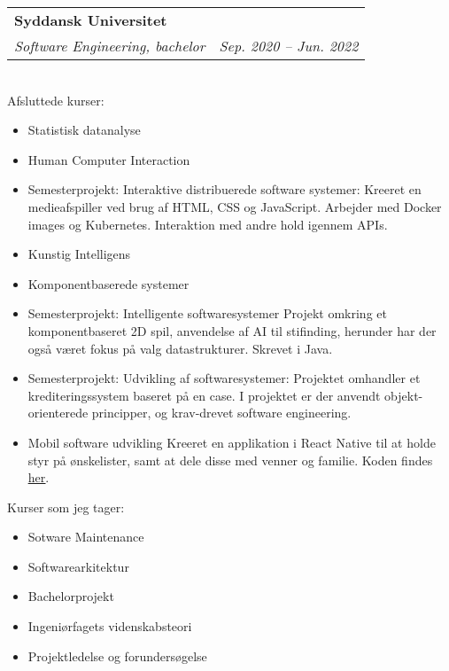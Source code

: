 \documentclass[11pt]{article}
\makeatletter
\newcommand{\resumeSubheading}[4]{
  \noindent\begin{tabular*}{0.98\textwidth}[t]{l@{\extracolsep{\fill}}r}
    \noindent \textbf{#1} & #2 \\ \vspace{-3pt} 
    \noindent \textit{\small#3} & \textit{\small #4} 
  \end{tabular*}\vspace{7pt}
}
\makeatother
\begin{document}
\resumeSubheading{Syddansk Universitet}{}{Software Engineering, bachelor}{Sep.
2020 -- Jun. 2022}\\\vspace{0.25cm}
{\indent\small Afsluttede kurser: }
  \vspace{-0.3cm}
  {\small 
  \begin{itemize}
  \setlength{\itemsep}{-1pt}
    \item Statistisk datanalyse
    \item Human Computer Interaction
    \item Semesterprojekt: Interaktive distribuerede software systemer:
      \subitem Kreeret en medieafspiller ved brug af HTML, CSS og JavaScript.
      Arbejder med Docker images og Kubernetes. Interaktion med andre hold
      igennem APIs.
    \item Kunstig Intelligens
    \item Komponentbaserede systemer
    \item Semesterprojekt: Intelligente softwaresystemer
      \subitem Projekt omkring et komponentbaseret 2D spil, anvendelse af AI til
      stifinding, herunder har der også været fokus på valg datastrukturer.
      Skrevet i Java.
    \item Semesterprojekt: Udvikling af softwaresystemer:
      \subitem Projektet omhandler et krediteringssystem baseret på en case. I
      projektet er der anvendt objekt-orienterede principper, og krav-drevet
      software engineering.
    \item Mobil software udvikling
      \subitem Kreeret en applikation i React Native til at holde styr på
      ønskelister, samt at dele disse med venner og familie. Koden findes
      \href{https://github.com/simonplatz/wishwell}{\underline{her}}.
\end{itemize}} 
{\indent\small Kurser som jeg tager:}
  {\small 
  \begin{itemize}
  \setlength{\itemsep}{-1pt}
    \item Sotware Maintenance
    \item Softwarearkitektur
    \item Bachelorprojekt
    \item Ingeniørfagets videnskabsteori
    \item Projektledelse og forundersøgelse
  \end{itemize}} 


\vspace{0.3cm}
\end{document}
